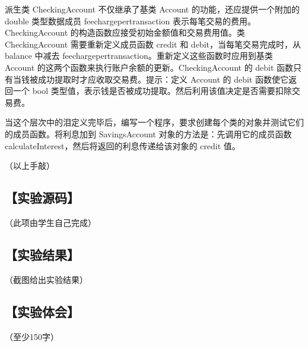 派生类 CheckingAccount 不仅继承了基类 Account 的功能，还应提供一个附加的 double 类型数据成员 feechargepertransaction 表示每笔交易的费用。CheckingAccount 的构造函数应接受初始金额值和交易费用值。类 CheckingAccount 需要重新定义成员函数 credit 和 debit，当每笔交易完成时，从 balance 中减去 feechargepertransaction。重新定义这些函数时应用到基类 Account 的这两个函数来执行账户余额的更新。CheckingAccount 的 debit 函数只有当钱被成功提取时才应收取交易费。提示：定义 Account 的 debit 函数使它返回一个 bool 类型值，表示钱是否被成功提取。然后利用该值决定是否需要扣除交易费。

当这个层次中的泪定义完毕后，编写一个程序，要求创建每个类的对象并测试它们的成员函数。将利息加到 SavingsAccount 对象的方法是：先调用它的成员函数 calculateInterest，然后将返回的利息传递给该对象的 credit 值。

（以上手敲）
\subsection*{【实验源码】}
（此项由学生自己完成）
\subsection*{【实验结果】}
（截图给出实验结果）
\subsection*{【实验体会】}
（至少150字）
